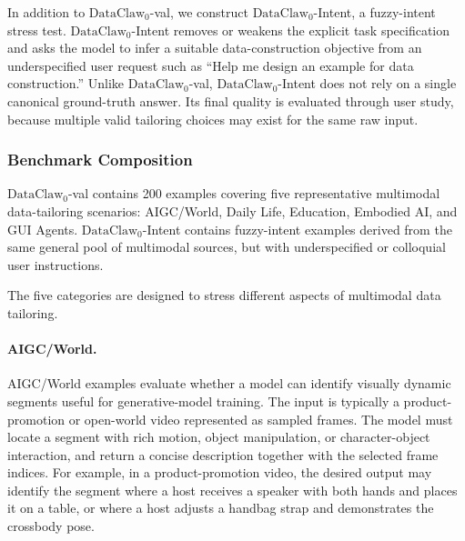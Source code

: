 In addition to $\text{DataClaw}_0$-val, we construct $\text{DataClaw}_0$-Intent, a fuzzy-intent stress test. $\text{DataClaw}_0$-Intent removes or weakens the explicit task specification and asks the model to infer a suitable data-construction objective from an underspecified user request such as ``Help me design an example for data construction.'' Unlike $\text{DataClaw}_0$-val, $\text{DataClaw}_0$-Intent does not rely on a single canonical ground-truth answer. Its final quality is evaluated through user study, because multiple valid tailoring choices may exist for the same raw input.

\subsubsection{Benchmark Composition}
\label{app:benchmark_composition}

$\text{DataClaw}_0$-val contains 200 examples covering five representative multimodal data-tailoring scenarios: AIGC/World, Daily Life, Education, Embodied AI, and GUI Agents. $\text{DataClaw}_0$-Intent contains fuzzy-intent examples derived from the same general pool of multimodal sources, but with underspecified or colloquial user instructions.

The five categories are designed to stress different aspects of multimodal data tailoring.

\paragraph{AIGC/World.}
AIGC/World examples evaluate whether a model can identify visually dynamic segments useful for generative-model training. The input is typically a product-promotion or open-world video represented as sampled frames. The model must locate a segment with rich motion, object manipulation, or character-object interaction, and return a concise description together with the selected frame indices. For example, in a product-promotion video, the desired output may identify the segment where a host receives a speaker with both hands and places it on a table, or where a host adjusts a handbag strap and demonstrates the crossbody pose. 

